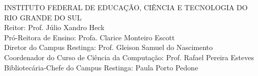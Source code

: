 %
%

\thispagestyle{empty}
\vspace*{\fill}

 \begin{flushleft}
\small \setlength{\baselineskip}{0.8\baselineskip}INSTITUTO FEDERAL DE EDUCAÇÃO, CIÊNCIA E TECNOLOGIA DO RIO GRANDE DO SUL\\
Reitor: Prof. Júlio Xandro Heck\\
Pró-Reitora de Ensino: Profa. Clarice Monteiro Escott\\
Diretor do Campus Restinga: Prof. Gleison Samuel do Nascimento\\
Coordenador do Curso de Ciência da Computação: Prof. Rafael Pereira Esteves\\
Bibliotecária-Chefe do Campus Restinga: Paula Porto Pedone\\
\end{flushleft}


